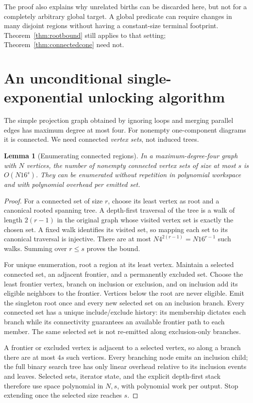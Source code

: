 \documentclass[11pt]{article}
\newtheorem{lemma}[theorem]{Lemma}
\theoremstyle{definition}
\begin{document}
The proof also explains why unrelated births can be discarded here, but
not for a completely arbitrary global target. A global predicate can
require changes in many disjoint regions without having a constant-size
terminal footprint. Theorem~\ref{thm:rootbound} still applies to that
setting; Theorem~\ref{thm:connectedcone} need not.

\section{An unconditional single-exponential unlocking algorithm}
\label{sec:main}

The simple projection graph obtained by ignoring loops and merging parallel
edges has maximum degree at most four. For nonempty one-component diagrams
it is connected. We need connected \emph{vertex sets}, not induced trees.

\begin{lemma}[Enumerating connected regions]
\label{lem:regions}
In a maximum-degree-four graph with $N$ vertices, the number of nonempty
connected vertex sets of size at most $s$ is $O(N16^s)$. They can be
enumerated without repetition in polynomial workspace and with polynomial
overhead per emitted set.
\end{lemma}

\begin{proof}
For a connected set of size $r$, choose its least vertex as root and a
canonical rooted spanning tree. A depth-first traversal of the tree is a
walk of length $2(r-1)$ in the original graph whose visited vertex set is
exactly the chosen set. A fixed walk identifies its visited set, so mapping
each set to its canonical traversal is injective. There are at most
$N4^{2(r-1)}=N16^{r-1}$ such walks. Summing over $r\le s$ proves the
bound.

For unique enumeration, root a region at its least vertex. Maintain a
selected connected set, an adjacent frontier, and a permanently excluded
set. Choose the least frontier vertex, branch on inclusion or exclusion,
and on inclusion add its eligible neighbors to the frontier. Vertices
below the root are never eligible. Emit the singleton root once and every
new selected set on an inclusion branch. Every connected set has a unique
include/exclude history: its membership dictates each branch while its
connectivity guarantees an available frontier path to each member. The
same selected set is not re-emitted along exclusion-only branches.

A frontier or excluded vertex is adjacent to a selected vertex, so along
a branch there are at most $4s$ such vertices. Every branching node emits
an inclusion child; the full binary search tree has only linear overhead
relative to its inclusion events and leaves. Selected sets, iterator state,
and the explicit depth-first stack therefore use space polynomial in
$N,s$, with polynomial work per output. Stop extending once the selected
size reaches $s$.
\end{proof}
\end{document}

